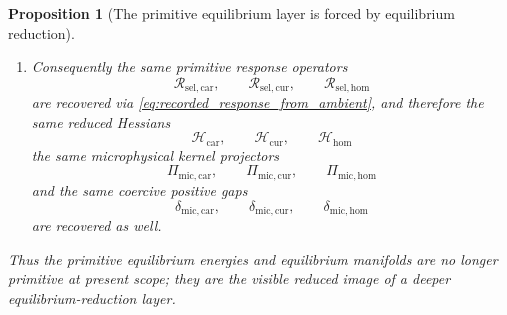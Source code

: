 \documentclass[11pt]{article}
\newcommand{\UltraCarProj}{\Pi_{\mathrm{mic,car}}}
\newcommand{\UltraCurProj}{\Pi_{\mathrm{mic,cur}}}
\newcommand{\UltraHomProj}{\Pi_{\mathrm{mic,hom}}}
\newcommand{\UltraCarGap}{\delta_{\mathrm{mic,car}}}
\newcommand{\UltraCurGap}{\delta_{\mathrm{mic,cur}}}
\newcommand{\UltraHomGap}{\delta_{\mathrm{mic,hom}}}
\newcommand{\TensorHess}{\mathcal H_{\mathrm{car}}}
\newcommand{\CurHess}{\mathcal H_{\mathrm{cur}}}
\newcommand{\HomHess}{\mathcal H_{\mathrm{hom}}}
\newcommand{\TensorResp}{\mathcal R_{\mathrm{sel,car}}}
\newcommand{\CurResp}{\mathcal R_{\mathrm{sel,cur}}}
\newcommand{\HomResp}{\mathcal R_{\mathrm{sel,hom}}}
\newcommand{\HomAmbientHess}{\mathbb H_{\mathrm{hom}}}
\newcommand{\CurEqKerProj}{\widetilde\Pi_{\mathrm{mic,cur}}}
\newcommand{\HomEqKerProj}{\widetilde\Pi_{\mathrm{mic,hom}}}
\newcommand{\EqCurGap}{\rho_{\mathrm{eq,cur}}}
\newcommand{\EqHomGap}{\rho_{\mathrm{eq,hom}}}
\newtheorem{proposition}{Proposition}
\begin{document}
\begin{proposition}[The primitive equilibrium layer is forced by equilibrium reduction]
\begin{enumerate}
\begin{equation}
    \ge
    \EqCurGap\norm{(\mathbf 1-\CurEqKerProj)\zeta}_{\mathrm{eq,cur}}^2,
    \label{eq:visible_hessian_gap_cur}
    \end{equation}
    \begin{equation}
    \langle \HomAmbientHess\omega,\omega\rangle_{\mathrm{eq,hom}}
    \ge
    \EqHomGap\norm{(\mathbf 1-\HomEqKerProj)\omega}_{\mathrm{eq,hom}}^2.
    \label{eq:visible_hessian_gap_hom}
    \end{equation}
    \item Consequently the same primitive response operators
    \[
    \TensorResp,\qquad
    \CurResp,\qquad
    \HomResp
    \]
    are recovered via \eqref{eq:recorded_response_from_ambient}, and therefore the same reduced Hessians
    \[
    \TensorHess,\qquad
    \CurHess,\qquad
    \HomHess
    \]
    the same microphysical kernel projectors
    \[
    \UltraCarProj,\qquad
    \UltraCurProj,\qquad
    \UltraHomProj
    \]
    and the same coercive positive gaps
    \[
    \UltraCarGap,\qquad
    \UltraCurGap,\qquad
    \UltraHomGap
    \]
    are recovered as well.
\end{enumerate}
Thus the primitive equilibrium energies and equilibrium manifolds are no longer primitive at present scope; they are the visible reduced image of a deeper equilibrium-reduction layer.
\end{proposition}
\end{document}
